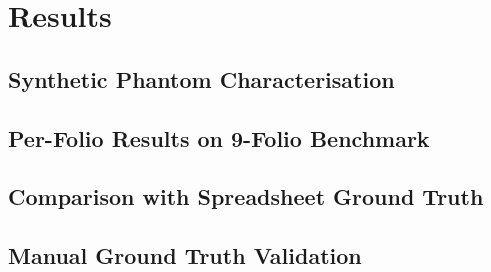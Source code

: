 \section{Results}
\label{sec:results}


\subsection{Synthetic Phantom Characterisation}
\label{sec:results:phantom}
%

\subsection{Per-Folio Results on 9-Folio Benchmark}
\label{sec:results:perfolio}
%

\subsection{Comparison with Spreadsheet Ground Truth}
\label{sec:results:spreadsheet}

\subsection{Manual Ground Truth Validation}
\label{sec:results:manualgt}

